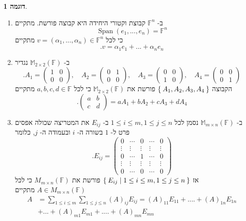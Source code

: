\documentclass[12pt]{report}
\theoremstyle{plain}
\theoremstyle{definition}
\newtheorem{example}{דוגמה}[chapter]
\newcommand{\F}{\mathbb{F}}
\newcommand{\M}{\mathbb{M}}
\newcommand{\0}{\mathbf{0}}
\DeclareMathOperator{\Span}{Span}
\begin{document}
\begin{example}\label{ex:standard-bases} \
\begin{enumerate}[label=\alph*.]
\item 
ב-
$\F^n$
קבוצת וקטורי היחידה היא קבוצה פורשת. מתקיים
$$
\Span(e_1,...,e_n)=\F^n
$$
כי לכל 
$v=(\alpha_1,...,\alpha_n)\in\F^n$
מתקיים
$$
.v=\alpha_1e_1+...+\alpha_ne_n
$$


\item 
ב-
$\M_{2\times 2}(\F)$
נגדיר
$$
.A_1=\begin{pmatrix}
1 & 0 \\
0 & 0
\end{pmatrix},\quad A_2=\begin{pmatrix}
0 & 1 \\
0 & 0
\end{pmatrix},\quad A_3=\begin{pmatrix}
0 & 0 \\
1 & 0
\end{pmatrix},\quad A_4=\begin{pmatrix}
0 & 0 \\
0 & 1
\end{pmatrix}
$$
הקבוצה
$\Set{A_1,A_2,A_3,A_4}$
פורשת את
$\M_{2\times 2}(\F)$
כי לכל
$a,b,c,d\in\F$
מתקיים
$$
.\begin{pmatrix}
a & b\\
c & d
\end{pmatrix}=aA_1+bA_2+cA_3+dA_4
$$


\item 
ב-
$\M_{m\times n}(\F)$
נסמן לכל
$1\leq i\leq m, 1\leq j\leq n$
ב-
$E_{ij}$
את המטריצה שכולה אפסים פרט ל-
$1$
בשורה ה-
$i$
ובעמודה ה-
$j$,
כלומר
$$
.E_{ij}=\begin{pmatrix}
0 &\cdots &0 &\cdots &0 \\
\vdots & \vdots &\vdots &\vdots &\vdots \\
0 &\cdots &1 &\cdots &0 \\
\vdots & \vdots &\vdots &\vdots &\vdots \\
0 &\cdots &0 &\cdots &0
\end{pmatrix}
$$
אז 
$\Set{E_{ij}|1\leq i\leq m, 1\leq j\leq n}$
פורשת את
$M_{m\times n}(\F)$
כי לכל
$A\in M_{m\times n}(\F)$
מתקיים
$$
\begin{aligned}
A&=\sum_{1\leq i\leq m}\sum_{1 \leq j \leq n}(A)_{ij}E_{ij}=(A)_{11}E_{11}+....+(A)_{1n}E_{1n}\\
&+...+(A)_{m1}E_{m1}+....+(A)_{mn}E_{mn}
\end{aligned}
$$


\end{enumerate}
\end{example}
\end{document}
